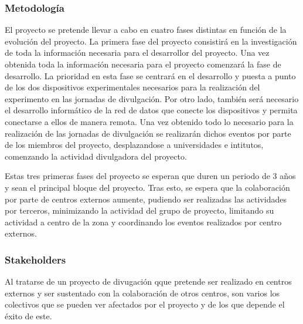 \documentclass[11pt]{extarticle}
\begin{document}
				\subsubsection{Metodología}
					\label{SubSubSec:}

					El proyecto se pretende llevar a cabo en cuatro fases distintas en función de la evolución del proyecto. La primera fase del proyecto consistirá en la investigación de toda la información necesaria para el desarrollor del proyecto. Una vez obtenida toda la información necesaria para el proyecto comenzará la fase de desarrollo. La prioridad en esta fase se centrará en el desarrollo y puesta a punto de los dos dispositivos experimentales necesarios para la realización del experimento en las jornadas de divulgación. Por otro lado, también será necesario el desarrollo informático de la red de datos que conecte los dispositivos y permita conectarse a ellos de manera remota. Una vez obtenido todo lo necesario para la realización de las jornadas de divulgación se realizarán dichos eventos por parte de los miembros del proyecto, desplazandose a universidades e intitutos, comenzando la actividad divulgadora del proyecto.

					Estas tres primeras fases del proyecto se esperan que duren un periodo de 3 años y sean el principal bloque del proyecto. Tras esto, se espera que la colaboración por parte de centros externos aumente, pudiendo ser realizadas las actividades por terceros, minimizando la actividad del grupo de proyecto, limitando su actividad a centro de la zona y coordinando los eventos realizados por centro externos.


				\subsubsection{Stakeholders}
					\label{SubSubSec:}

					Al tratarse de un proyecto de divugación qque pretende ser realizado en centros externos y ser sustentado con la colaboración de otros centros, son varios los colectivos que se pueden ver afectados por el proyecto y de los que depende el éxito de este.
\end{document}
